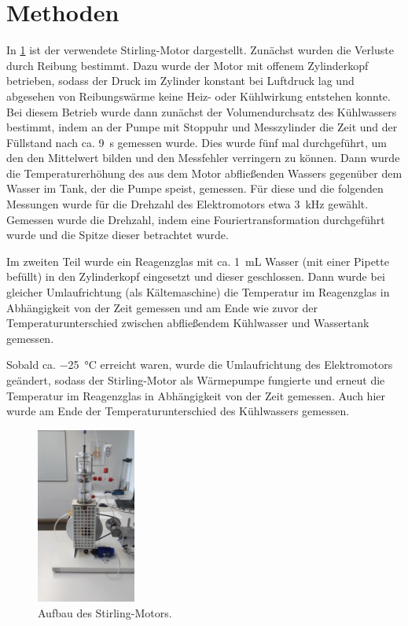 \documentclass[
	a4paper,
	12pt,
	pagesize,
	ngerman
]{scrartcl}
\begin{document}
	\section{Methoden} \label{sec_Methoden}
	
	In \cref{Aufbau} ist der verwendete Stirling-Motor dargestellt.
	Zunächst wurden die Verluste durch Reibung bestimmt.
	Dazu wurde der Motor mit offenem Zylinderkopf betrieben, sodass der Druck im Zylinder konstant bei Luftdruck lag und abgesehen von Reibungswärme keine Heiz- oder Kühlwirkung entstehen konnte.
	Bei diesem Betrieb wurde dann zunächst der Volumendurchsatz des Kühlwassers bestimmt, indem an der Pumpe mit Stoppuhr und Messzylinder die Zeit und der Füllstand nach ca. \SI{9}{\second} gemessen wurde.
	Dies wurde fünf mal durchgeführt, um den den Mittelwert bilden und den Messfehler verringern zu können.
	Dann wurde die Temperaturerhöhung des aus dem Motor abfließenden Wassers gegenüber dem Wasser im Tank, der die Pumpe speist, gemessen.
	Für diese und die folgenden Messungen wurde für die Drehzahl des Elektromotors etwa \SI{3}{\kilo \hertz} gewählt.
	Gemessen wurde die Drehzahl, indem eine Fouriertransformation durchgeführt wurde und die Spitze dieser betrachtet wurde.
	
	Im zweiten Teil wurde ein Reagenzglas mit ca. \SI{1}{\milli \liter} Wasser (mit einer Pipette befüllt) in den Zylinderkopf eingesetzt und dieser geschlossen.
	Dann wurde bei gleicher Umlaufrichtung (als Kältemaschine) die Temperatur im Reagenzglas in Abhängigkeit von der Zeit gemessen und am Ende wie zuvor der Temperaturunterschied zwischen abfließendem Kühlwasser und Wassertank gemessen.
	
	Sobald ca. \SI{-25}{\degreeCelsius} erreicht waren, wurde die Umlaufrichtung des Elektromotors geändert, sodass der Stirling-Motor als Wärmepumpe fungierte und erneut die Temperatur im Reagenzglas in Abhängigkeit von der Zeit gemessen.
	Auch hier wurde am Ende der Temperaturunterschied des Kühlwassers gemessen.
	
	\begin{figure}[H]
		\includegraphics[width=0.29\textwidth]{Aufbau}
		\centering
		\caption{Aufbau des Stirling-Motors.}
		\label{Aufbau}
		\centering
	\end{figure} 
\end{document}

